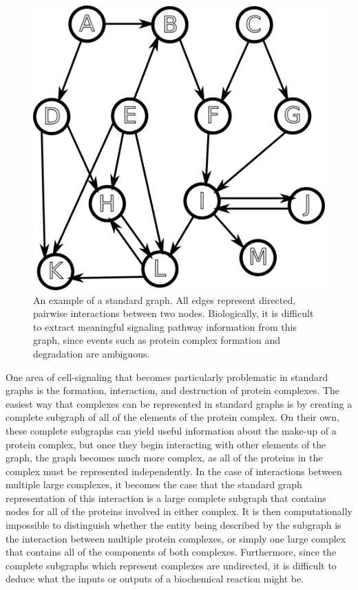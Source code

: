 \documentclass[12pt,twoside]{reedthesis}
\theoremstyle{definition}
\begin{document}
\begin{figure}[thbp]
  \begin{center}
    \includegraphics[width=\textwidth/2]{example-standard-graph}
  \caption[An example of a standard graph.]{An example of a standard graph. All edges represent directed, pairwise interactions between two nodes. Biologically, it is difficult to extract meaningful signaling pathway information from this graph, since events such as protein complex formation and degradation are ambiguous.}
  \label{fig:example-standard-graph}
  \end{center}
\end{figure}

One area of cell-signaling that becomes particularly problematic in standard graphs is the formation, interaction, and destruction of protein complexes.  The easiest way that complexes can be represented in standard graphs is by creating a complete subgraph of all of the elements of the protein complex.  On their own, these complete subgraphs can yield useful information about the make-up of a protein complex, but once they begin interacting with other elements of the graph, the graph becomes much more complex, as all of the proteins in the complex must be represented independently.  In the case of interactions between multiple large complexes, it becomes the case that the standard graph representation of this interaction is a large complete subgraph that contains nodes for all of the proteins involved in either complex.  It is then computationally impossible to distinguish whether the entity being described by the subgraph is the interaction between multiple protein complexes, or simply one large complex that contains all of the components of both complexes.  Furthermore, since the complete subgraphs which represent complexes are undirected, it is difficult to deduce what the inputs or outputs of a biochemical reaction might be.\par
\end{document}
